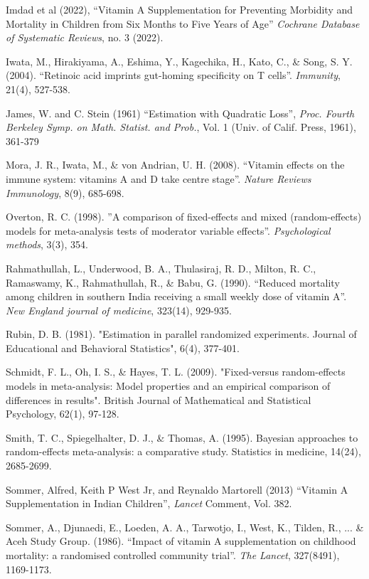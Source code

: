 \documentclass[12pt]{article}
\begin{document}
\begin{thebibliography}{99}
 Imdad et al (2022), ``Vitamin A Supplementation for Preventing Morbidity and Mortality in Children from Six Months to Five Years of Age'' \emph{Cochrane Database of Systematic Reviews}, no. 3 (2022).

 Iwata, M., Hirakiyama, A., Eshima, Y., Kagechika, H., Kato, C., \& Song, S. Y. (2004). ``Retinoic acid imprints gut-homing specificity on T cells''. \emph{Immunity}, 21(4), 527-538.

 James, W. and C. Stein (1961) ``Estimation with Quadratic Loss'', \emph{Proc. Fourth Berkeley Symp. on Math. Statist. and Prob.}, Vol. 1 (Univ. of Calif. Press, 1961), 361-379

 Mora, J. R., Iwata, M., \& von Andrian, U. H. (2008). ``Vitamin effects on the immune system: vitamins A and D take centre stage''. \emph{Nature Reviews Immunology}, 8(9), 685-698.

 Overton, R. C. (1998). ''A comparison of fixed-effects and mixed (random-effects) models for meta-analysis tests of moderator variable effects''. \emph{Psychological methods}, 3(3), 354.

 Rahmathullah, L., Underwood, B. A., Thulasiraj, R. D., Milton, R. C., Ramaswamy, K., Rahmathullah, R., \& Babu, G. (1990). ``Reduced mortality among children in southern India receiving a small weekly dose of vitamin A''. \emph{New England journal of medicine}, 323(14), 929-935.

 Rubin, D. B. (1981). "Estimation in parallel randomized experiments. Journal of Educational and Behavioral Statistics", 6(4), 377-401.

 Schmidt, F. L., Oh, I. S., \& Hayes, T. L. (2009). "Fixed-versus random-effects models in meta-analysis: Model properties and an empirical comparison of differences in results". British Journal of Mathematical and Statistical Psychology, 62(1), 97-128.

 Smith, T. C., Spiegelhalter, D. J., \& Thomas, A. (1995). Bayesian approaches to random-effects meta-analysis: a comparative study. Statistics in medicine, 14(24), 2685-2699.

 Sommer, Alfred, Keith P West Jr, and Reynaldo Martorell (2013) ``Vitamin A Supplementation in Indian Children'', \emph{Lancet} Comment, Vol. 382.

 Sommer, A., Djunaedi, E., Loeden, A. A., Tarwotjo, I., West, K., Tilden, R., ... \& Aceh Study Group. (1986). ``Impact of vitamin A supplementation on childhood mortality: a randomised controlled community trial''. \emph{The Lancet}, 327(8491), 1169-1173.


\end{thebibliography}
\end{document}
